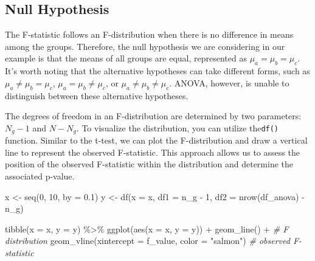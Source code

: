 \documentclass[
]{book}
\newenvironment{Shaded}{\begin{snugshade}}{\end{snugshade}}
\newcommand{\AttributeTok}[1]{\textcolor[rgb]{0.77,0.63,0.00}{#1}}
\newcommand{\CommentTok}[1]{\textcolor[rgb]{0.56,0.35,0.01}{\textit{#1}}}
\newcommand{\DecValTok}[1]{\textcolor[rgb]{0.00,0.00,0.81}{#1}}
\newcommand{\FloatTok}[1]{\textcolor[rgb]{0.00,0.00,0.81}{#1}}
\newcommand{\FunctionTok}[1]{\textcolor[rgb]{0.00,0.00,0.00}{#1}}
\newcommand{\NormalTok}[1]{#1}
\newcommand{\OtherTok}[1]{\textcolor[rgb]{0.56,0.35,0.01}{#1}}
\newcommand{\SpecialCharTok}[1]{\textcolor[rgb]{0.00,0.00,0.00}{#1}}
\newcommand{\StringTok}[1]{\textcolor[rgb]{0.31,0.60,0.02}{#1}}
\begin{document}
\hypertarget{null-hypothesis-1}{%
\subsection{Null Hypothesis}\label{null-hypothesis-1}}

The F-statistic follows an F-distribution when there is no difference in means among the groups. Therefore, the null hypothesis we are considering in our example is that the means of all groups are equal, represented as \(\mu_a = \mu_b = \mu_c\). It's worth noting that the alternative hypotheses can take different forms, such as \(\mu_a \ne \mu_b = \mu_c\), \(\mu_a = \mu_b \ne \mu_c\), or \(\mu_a \ne \mu_b \ne \mu_c\). ANOVA, however, is unable to distinguish between these alternative hypotheses.

The degrees of freedom in an F-distribution are determined by two parameters: \(N_g - 1\) and \(N - N_g\). To visualize the distribution, you can utilize the\texttt{df()} function. Similar to the t-test, we can plot the F-distribution and draw a vertical line to represent the observed F-statistic. This approach allows us to assess the position of the observed F-statistic within the distribution and determine the associated p-value.

\begin{Shaded}
\begin{Highlighting}[]
\NormalTok{x }\OtherTok{\textless{}{-}} \FunctionTok{seq}\NormalTok{(}\DecValTok{0}\NormalTok{, }\DecValTok{10}\NormalTok{, }\AttributeTok{by =} \FloatTok{0.1}\NormalTok{)}
\NormalTok{y }\OtherTok{\textless{}{-}} \FunctionTok{df}\NormalTok{(}\AttributeTok{x =}\NormalTok{ x, }\AttributeTok{df1 =}\NormalTok{ n\_g }\SpecialCharTok{{-}} \DecValTok{1}\NormalTok{, }\AttributeTok{df2 =} \FunctionTok{nrow}\NormalTok{(df\_anova) }\SpecialCharTok{{-}}\NormalTok{ n\_g)}

\FunctionTok{tibble}\NormalTok{(}\AttributeTok{x =}\NormalTok{ x, }\AttributeTok{y =}\NormalTok{ y) }\SpecialCharTok{\%\textgreater{}\%} 
  \FunctionTok{ggplot}\NormalTok{(}\FunctionTok{aes}\NormalTok{(}\AttributeTok{x =}\NormalTok{ x,}
             \AttributeTok{y =}\NormalTok{ y)) }\SpecialCharTok{+} 
  \FunctionTok{geom\_line}\NormalTok{() }\SpecialCharTok{+} \CommentTok{\# F distribution}
  \FunctionTok{geom\_vline}\NormalTok{(}\AttributeTok{xintercept =}\NormalTok{ f\_value,}
             \AttributeTok{color =} \StringTok{"salmon"}\NormalTok{) }\CommentTok{\# observed F{-}statistic}
\end{Highlighting}
\end{Shaded}
\end{document}
